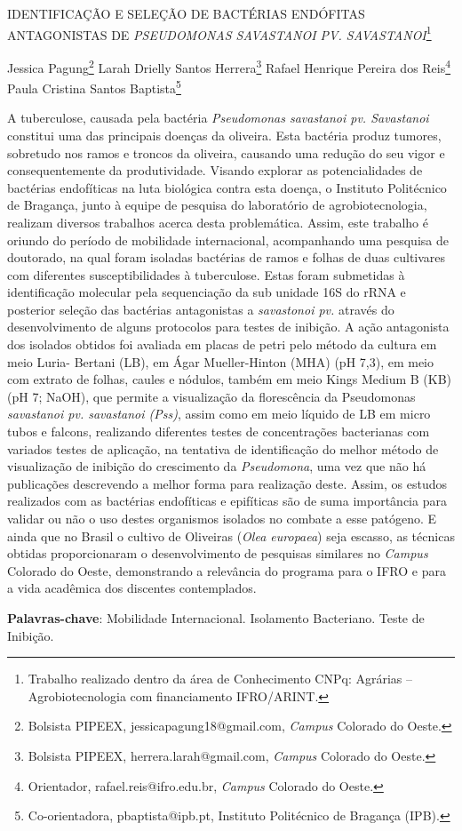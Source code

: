\documentclass[article,12pt,onesidea,4paper,english,brazil]{abntex2}
\begin{document}
	
	
	\frenchspacing 
	
	\begin{center}
		\LARGE IDENTIFICAÇÃO E SELEÇÃO DE BACTÉRIAS ENDÓFITAS ANTAGONISTAS DE \textit{PSEUDOMONAS SAVASTANOI PV. SAVASTANOI}\footnote{Trabalho realizado dentro da área de Conhecimento CNPq: Agrárias – Agrobiotecnologia com financiamento IFRO/ARINT.}
		
		\normalsize
		Jessica Pagung\footnote{Bolsista PIPEEX, jessicapagung18@gmail.com, \textit{Campus} Colorado do Oeste.} 
		Larah Drielly Santos Herrera\footnote{Bolsista PIPEEX, herrera.larah@gmail.com, \textit{Campus} Colorado do Oeste.} 
		Rafael Henrique Pereira dos Reis\footnote{Orientador, rafael.reis@ifro.edu.br, \textit{Campus} Colorado do Oeste.} 
		Paula Cristina Santos Baptista\footnote{Co-orientadora, pbaptista@ipb.pt, Instituto Politécnico de Bragança (IPB).} 
	\end{center}
	
	\noindent A tuberculose, causada pela bactéria \textit{Pseudomonas savastanoi pv. Savastanoi}	constitui uma das principais doenças da oliveira. Esta bactéria produz tumores,	sobretudo nos ramos e troncos da oliveira, causando uma redução do seu vigor e	consequentemente da produtividade. 
	Visando explorar as potencialidades de bactérias endofíticas na luta biológica contra esta doença, o Instituto Politécnico de
	Bragança, junto à equipe de pesquisa do laboratório de agrobiotecnologia, realizam
	diversos trabalhos acerca desta problemática. Assim, este trabalho é oriundo do
	período de mobilidade internacional, acompanhando uma pesquisa de doutorado, na
	qual foram isoladas bactérias de ramos e folhas de duas cultivares com diferentes
	susceptibilidades à tuberculose. Estas foram submetidas à identificação molecular
	pela sequenciação da sub unidade 16S do rRNA e posterior seleção das bactérias
	antagonistas a \textit{savastonoi pv.} através do desenvolvimento de alguns protocolos para	testes de inibição. A ação antagonista dos isolados obtidos foi avaliada em placas de
	petri pelo método da cultura em meio Luria- Bertani (LB), em Ágar Mueller-Hinton
	(MHA) (pH 7,3), em meio com extrato de folhas, caules e nódulos, também em meio
	Kings Medium B (KB) (pH 7; NaOH), que permite a visualização da florescência da
	Pseudomonas \textit{savastanoi pv. savastanoi (Pss)}, assim como em meio líquido de LB
	em micro tubos e falcons, realizando diferentes testes de concentrações bacterianas
	com variados testes de aplicação, na tentativa de identificação do melhor método de
	visualização de inibição do crescimento da \textit{Pseudomona}, uma vez que não há
	publicações descrevendo a melhor forma para realização deste. Assim, os estudos
	realizados com as bactérias endofíticas e epifíticas são de suma importância para
	validar ou não o uso destes organismos isolados no combate a esse patógeno. E
	ainda que no Brasil o cultivo de Oliveiras (\textit{Olea europaea}) seja escasso, as técnicas
	obtidas proporcionaram o desenvolvimento de pesquisas similares no \textit{Campus}
	Colorado do Oeste, demonstrando a relevância do programa para o IFRO e para a
	vida acadêmica dos discentes contemplados.
	
	\vspace{\onelineskip}
	
	\noindent
	\textbf{Palavras-chave}: Mobilidade Internacional. Isolamento Bacteriano. Teste de Inibição.
	
\end{document}
